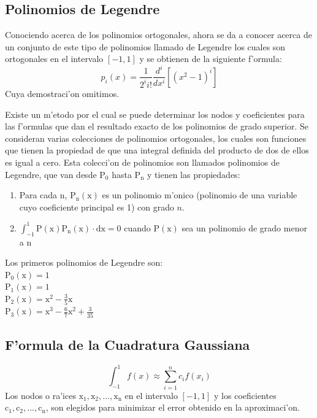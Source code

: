 \documentclass[12pt]{article}
\begin{document}
				\subsection*{Polinomios de Legendre}
					Conociendo acerca de los polinomios ortogonales, ahora se da a conocer acerca de un conjunto de este tipo de polinomios llamado de Legendre los cuales son ortogonales en el intervalo $\mathrm{[-1, 1]}$ y se obtienen de la siguiente f'ormula:		
					\begin{equation}
						p_{i}(x)=\frac{1}{2^{i}i!}\frac{d^{i}}{d x^{i}}[(x^{2}-1)^{i}]
					\end{equation}
					Cuya demostraci'on omitimos.
					
					Existe un m'etodo por el cual se puede determinar los nodos y coeficientes  para las f'ormulas que dan el resultado exacto de los polinomios de grado superior. Se consideran varias colecciones de polinomios ortogonales, los cuales son funciones que tienen la propiedad de que una integral definida del producto de dos de ellos es igual a cero. Esta colecci'on de polinomios son llamados polinomios de Legendre, que van desde $\mathrm{P_{0}}$ hasta $\mathrm{P_{n}}$ y tienen las propiedades:
					\begin{enumerate}[1.]
						\item 
						Para cada $\mathrm{n}$, $\mathrm{P_{n}(x)}$ es un polinomio m'onico (polinomio de una variable cuyo coeficiente principal es 1) con grado $n$.
						\item
						$\mathrm{\int_{-1}^{1}P(x)P_{n}(x)\cdot dx = 0}$ cuando $\mathrm{P(x)}$ sea un polinomio de grado menor a $\mathrm{n}$
					\end{enumerate}
					
					Los primeros polinomios de Legendre son:\\
					$\mathrm{P_{0}(x)=1}$\\
					$\mathrm{P_{1}(x)=1}$\\
					$\mathrm{P_{2}(x)=x^{2}-\frac{3}{5}x}$\\
					$\mathrm{P_{3}(x)=x^{3}-\frac{6}{7}x^{2}+\frac{3}{35}}$\\	
				\subsection*{F'ormula de la Cuadratura Gaussiana}
					\begin{equation}
						\int_{-1}^{1}f(x)\approx \sum_{i=1}^{n}c_{i}f(x_{i})
					\end{equation}
					Los nodos o ra'ices $\mathrm{x_{1}, x_{2}, ..., x_{n}}$ en el intervalo $\mathrm{[-1,1]}$ y los coeficientes $\mathrm{c_{1}, c_{2}, ..., c_{n}}$, son elegidos para minimizar el error obtenido en la aproximaci'on.
					
\end{document}
